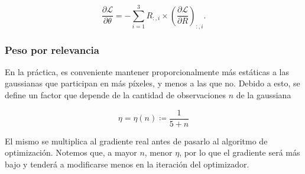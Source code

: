 \begin{equation}
\frac{\partial \mathcal{L}}{\partial \theta}
=
-
\sum_{i=1}^{3}
R_{:,i}
\times
\left(
\frac{\partial \mathcal{L}}{\partial R}
\right)_{:,i}.
\end{equation}

\subsubsection{Peso por relevancia}

En la práctica, es conveniente mantener proporcionalmente más estáticas a las gaussianas que participan en más píxeles, y menos a las que no. Debido a esto, se define un factor que depende de la cantidad de observaciones $n$ de la gaussiana

\begin{equation}
    \eta = \eta(n) \coloneq \frac{1}{5 + n}
\end{equation}

El mismo se multiplica al gradiente real antes de pasarlo al algoritmo de optimización. Notemos que, a mayor $n$, menor $\eta$, por lo que el gradiente será más bajo y tenderá a modificarse menos en la iteración del optimizador.